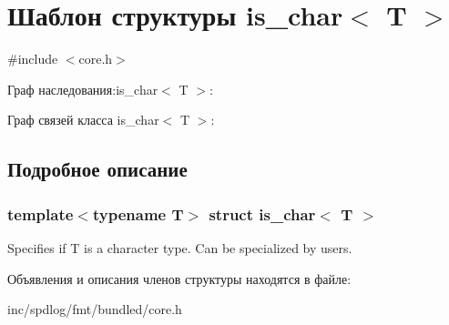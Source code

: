 \hypertarget{structis__char}{}\section{Шаблон структуры is\+\_\+char$<$ T $>$}
\label{structis__char}


{\ttfamily \#include $<$core.\+h$>$}



Граф наследования\+:is\+\_\+char$<$ T $>$\+:


Граф связей класса is\+\_\+char$<$ T $>$\+:


\subsection{Подробное описание}
\subsubsection*{template$<$typename T$>$\newline
struct is\+\_\+char$<$ T $>$}

Specifies if {\ttfamily T} is a character type. Can be specialized by users. 

Объявления и описания членов структуры находятся в файле\+:\begin{DoxyCompactItemize}
\item 
inc/spdlog/fmt/bundled/core.\+h\end{DoxyCompactItemize}
